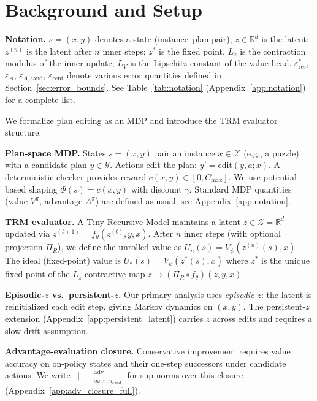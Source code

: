 \documentclass{article}
\theoremstyle{plain}
\theoremstyle{definition}
\theoremstyle{remark}
\newcommand{\shortonly}[1]{#1}
\newcommand{\shortonly}[1]{}
\newcommand{\R}{\mathbb{R}}
\newcommand{\XX}{\mathcal{X}}
\newcommand{\YY}{\mathcal{Y}}
\newcommand{\ZZ}{\mathcal{Z}}
\begin{document}
\section{Background and Setup}
\label{sec:setup}

\shortonly{
\textbf{Notation.}
$s = (x, y)$ denotes a state (instance--plan pair); $z \in \mathbb{R}^d$ is the latent; $z^{(n)}$ is the latent after $n$ inner steps; $z^*$ is the fixed point. $L_z$ is the contraction modulus of the inner update; $L_V$ is the Lipschitz constant of the value head. $\varepsilon_{\mathrm{res}}^*$, $\varepsilon_A$, $\varepsilon_{A,\mathrm{cand}}$, $\varepsilon_{\mathrm{cent}}$ denote various error quantities defined in Section~\ref{sec:error_bounds}. See Table~\ref{tab:notation} (Appendix~\ref{app:notation}) for a complete list.

We formalize plan editing as an MDP and introduce the TRM evaluator structure.

\textbf{Plan-space MDP.}
States $s=(x,y)$ pair an instance $x\in\XX$ (e.g., a puzzle) with a candidate plan $y\in\YY$.
Actions edit the plan: $y'=\mathrm{edit}(y,a;x)$.
A deterministic checker provides reward $c(x,y)\in[0,C_{\max}]$.
We use potential-based shaping $\Phi(s)=c(x,y)$ with discount $\gamma$.
Standard MDP quantities (value $V^\pi$, advantage $A^\pi$) are defined as usual; see Appendix~\ref{app:notation}.

\textbf{TRM evaluator.}
A Tiny Recursive Model maintains a latent $z\in\ZZ=\R^d$ updated via $z^{(t+1)}=f_\theta(z^{(t)},y,x)$.
After $n$ inner steps (with optional projection $\Pi_R$), we define the unrolled value as $U_n(s)=V_\psi(z^{(n)}(s),x)$.
The ideal (fixed-point) value is $U_*(s)=V_\psi(z^*(s),x)$ where $z^*$ is the unique fixed point of the $L_z$-contractive map $z\mapsto (\Pi_R\circ f_\theta)(z,y,x)$.

\textbf{Episodic-$z$ vs.\ persistent-$z$.}
Our primary analysis uses \emph{episodic-$z$}: the latent is reinitialized each edit step, giving Markov dynamics on $(x,y)$.
The persistent-$z$ extension (Appendix~\ref{app:persistent_latent}) carries $z$ across edits and requires a slow-drift assumption.

\textbf{Advantage-evaluation closure.}
Conservative improvement requires value accuracy on on-policy states and their one-step successors under candidate actions.
We write $\|\cdot\|_{\infty,\pi,\pi_{\mathrm{cand}}}^{\mathrm{adv}}$ for sup-norms over this closure (Appendix~\ref{app:adv_closure_full}).}
\end{document}
